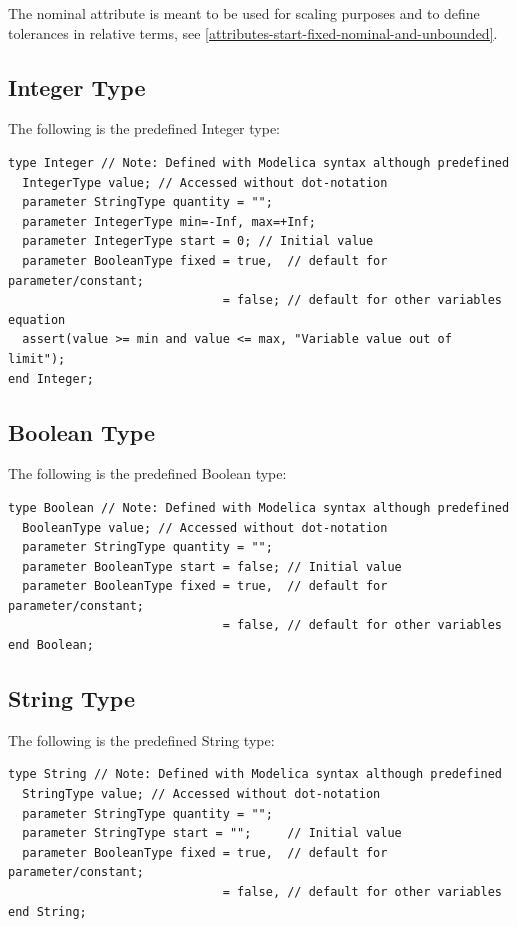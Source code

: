 \documentclass[10pt,a4paper]{report}
\def\doublelabel#1{\label{#1}\hypertarget{#1}{}}
\begin{document}
The nominal attribute is meant to be used for scaling purposes and to
define tolerances in relative terms, see \ref{attributes-start-fixed-nominal-and-unbounded}.

\subsection{Integer Type}\doublelabel{integer-type}
The following is the predefined Integer type:
\begin{lstlisting}[language=Modelica]
type Integer // Note: Defined with Modelica syntax although predefined
  IntegerType value; // Accessed without dot-notation
  parameter StringType quantity = "";
  parameter IntegerType min=-Inf, max=+Inf;
  parameter IntegerType start = 0; // Initial value
  parameter BooleanType fixed = true,  // default for parameter/constant;
                              = false; // default for other variables
equation
  assert(value >= min and value <= max, "Variable value out of limit");
end Integer;
\end{lstlisting}

\subsection{Boolean Type}\doublelabel{boolean-type}
The following is the predefined Boolean type:
\begin{lstlisting}[language=Modelica]
type Boolean // Note: Defined with Modelica syntax although predefined
  BooleanType value; // Accessed without dot-notation
  parameter StringType quantity = "";
  parameter BooleanType start = false; // Initial value
  parameter BooleanType fixed = true,  // default for parameter/constant;
                              = false, // default for other variables
end Boolean;
\end{lstlisting}

\subsection{String Type}\doublelabel{string-type}

The following is the predefined String type:
\begin{lstlisting}[language=Modelica]
type String // Note: Defined with Modelica syntax although predefined
  StringType value; // Accessed without dot-notation
  parameter StringType quantity = "";
  parameter StringType start = "";     // Initial value
  parameter BooleanType fixed = true,  // default for parameter/constant;
                              = false, // default for other variables
end String;
\end{lstlisting}
\end{document}
